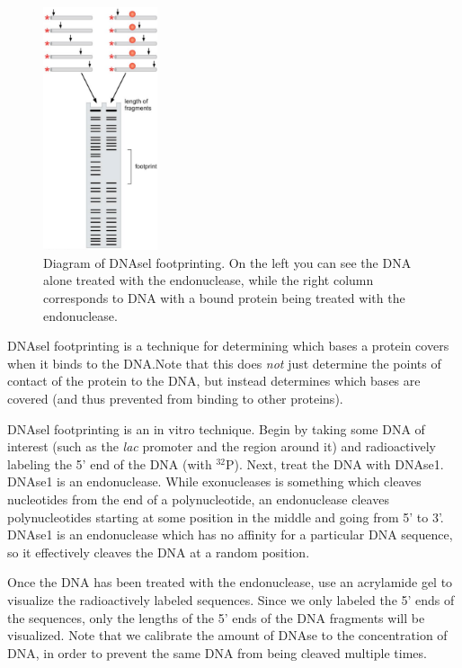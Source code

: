 \documentclass{article}
\begin{document}
\begin{figure}[h!]
    \begin{center}
        \includegraphics[width=0.3\textwidth]{images/dnasel-footprinting.png}
    \end{center}
    \caption{
        Diagram of DNAsel footprinting. On the left you can see the DNA alone treated with the endonuclease, while
        the right column corresponds to DNA with a bound protein being treated with the
        endonuclease.
    }
\end{figure}

DNAsel footprinting is a technique for determining which bases a protein covers when it binds to the
DNA.\@ Note that this does \emph{not} just determine the points of contact of the protein to the DNA,
but instead determines which bases are covered (and thus prevented from binding to other proteins). 

DNAsel footprinting is an in vitro technique. Begin by taking some DNA of interest (such as the
\emph{lac} promoter and the region around it) and radioactively labeling the 5' end of the DNA (with
$^{32}$P). Next, treat the DNA with DNAse1. DNAse1 is an endonuclease. While exonucleases is
something which cleaves nucleotides from the end of a polynucleotide, an endonuclease cleaves
polynucleotides starting at some position in the middle and going from 5' to 3'. DNAse1 is an
endonuclease which has no affinity for a particular DNA sequence, so it effectively cleaves the DNA
at a random position.

Once the DNA has been treated with the endonuclease, use an acrylamide gel to visualize the
radioactively labeled sequences. Since we only labeled the 5' ends of the sequences, only the
lengths of the 5' ends of the DNA fragments will be visualized. Note that we calibrate the amount of
DNAse to the concentration of DNA, in order to prevent the same DNA from being cleaved multiple
times.
\end{document}
